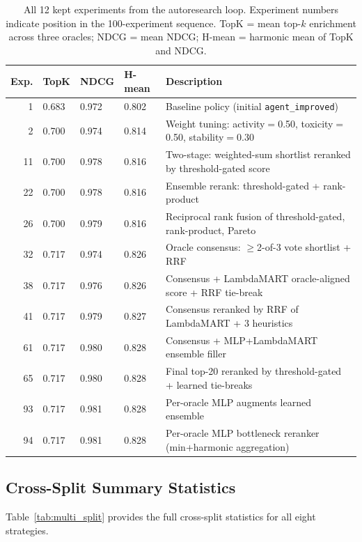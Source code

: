 \begin{table}[h]
\centering
\caption{All 12 kept experiments from the autoresearch loop. Experiment numbers indicate position in the 100-experiment sequence. TopK = mean top-$k$ enrichment across three oracles; NDCG = mean NDCG; H-mean = harmonic mean of TopK and NDCG.}
\label{tab:keeps}
\small
\begin{tabular}{@{}rlllp{7.5cm}@{}}
\toprule
\textbf{Exp.} & \textbf{TopK} & \textbf{NDCG} & \textbf{H-mean} & \textbf{Description} \\
\midrule
1 & 0.683 & 0.972 & 0.802 & Baseline policy (initial \texttt{agent\_improved}) \\
2 & 0.700 & 0.974 & 0.814 & Weight tuning: activity$=$0.50, toxicity$=$0.50, stability$=$0.30 \\
11 & 0.700 & 0.978 & 0.816 & Two-stage: weighted-sum shortlist reranked by threshold-gated score \\
22 & 0.700 & 0.978 & 0.816 & Ensemble rerank: threshold-gated + rank-product \\
26 & 0.700 & 0.979 & 0.816 & Reciprocal rank fusion of threshold-gated, rank-product, Pareto \\
32 & 0.717 & 0.974 & 0.826 & Oracle consensus: $\geq$2-of-3 vote shortlist + RRF \\
38 & 0.717 & 0.976 & 0.826 & Consensus + LambdaMART oracle-aligned score + RRF tie-break \\
41 & 0.717 & 0.979 & 0.827 & Consensus reranked by RRF of LambdaMART + 3 heuristics \\
61 & 0.717 & 0.980 & 0.828 & Consensus + MLP+LambdaMART ensemble filler \\
65 & 0.717 & 0.980 & 0.828 & Final top-20 reranked by threshold-gated + learned tie-breaks \\
93 & 0.717 & 0.981 & 0.828 & Per-oracle MLP augments learned ensemble \\
94 & 0.717 & 0.981 & 0.828 & Per-oracle MLP bottleneck reranker (min+harmonic aggregation) \\
\bottomrule
\end{tabular}
\end{table}

\subsection{Cross-Split Summary Statistics}
\label{sec:supp_multi_split}

Table~\ref{tab:multi_split} provides the full cross-split statistics for all eight strategies.

